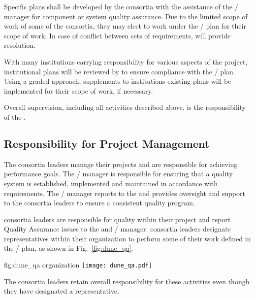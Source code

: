 Specific  plans shall be developed by the consortia with the
assistance of the /  manager for
component or system quality assurance. Due to the limited scope of
work of some of the consortia, they may elect to work under the
/  plan for their scope of work. In
case of conflict between sets of  requirements, 
 will provide resolution.

With many institutions carrying responsibility for various aspects of
the project, institutional  plans will be reviewed by
  to ensure compliance with the
/  plan. Using a graded approach,
supplements to institutions existing plans will be implemented for
their  scope of work, if necessary.

Overall  supervision, including all activities described
above, is the responsibility of the  .

\subsection{Responsibility for Project Management}

The  consortia leaders manage their projects and are
responsible for achieving performance goals. The
/  manager is responsible for
ensuring that a quality system is established, implemented and
maintained in accordance with requirements. The
/  manager reports to the
  and provides oversight and support to the
consortia leaders to ensure a consistent quality program.

 consortia leaders are responsible for quality within
their project and report Quality Assurance issues to the 
 and / 
manager.  consortia leaders designate 
representatives within their organization to perform some of their
work defined in the /  plan, as
shown in Fig.~\ref{fig:dune_qa}.
\begin{dunefigure}{fig:dune_qa}
  {  organization}
  \texttt{[image: dune\_qa.pdf]}
\end{dunefigure}
The  consortia leaders retain overall responsibility for
these activities even though they have designated a 
representative.

